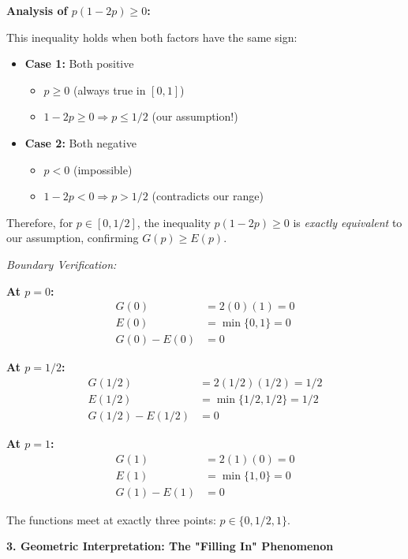 \documentclass[12pt]{article}
\begin{document}
\begin{explanation}
\textbf{Analysis of $p(1-2p) \geq 0$:}

This inequality holds when both factors have the same sign:

\begin{itemize}
    \item \textbf{Case 1:} Both positive
    \begin{itemize}
        \item $p \geq 0$ (always true in $[0,1]$)
        \item $1 - 2p \geq 0 \Rightarrow p \leq 1/2$ (our assumption!)
    \end{itemize}

    \item \textbf{Case 2:} Both negative
    \begin{itemize}
        \item $p < 0$ (impossible)
        \item $1 - 2p < 0 \Rightarrow p > 1/2$ (contradicts our range)
    \end{itemize}
\end{itemize}

Therefore, for $p \in [0, 1/2]$, the inequality $p(1-2p) \geq 0$ is \textit{exactly equivalent} to our assumption, confirming $G(p) \geq E(p)$.

\textit{Boundary Verification:}

\textbf{At $p = 0$:}
\begin{align*}
G(0) &= 2(0)(1) = 0 \\
E(0) &= \min\{0, 1\} = 0 \\
G(0) - E(0) &= 0
\end{align*}

\textbf{At $p = 1/2$:}
\begin{align*}
G(1/2) &= 2(1/2)(1/2) = 1/2 \\
E(1/2) &= \min\{1/2, 1/2\} = 1/2 \\
G(1/2) - E(1/2) &= 0
\end{align*}

\textbf{At $p = 1$:}
\begin{align*}
G(1) &= 2(1)(0) = 0 \\
E(1) &= \min\{1, 0\} = 0 \\
G(1) - E(1) &= 0
\end{align*}

The functions meet at exactly three points: $p \in \{0, 1/2, 1\}$.

\textbf{3. Geometric Interpretation: The "Filling In" Phenomenon}


\end{explanation}
\end{document}
